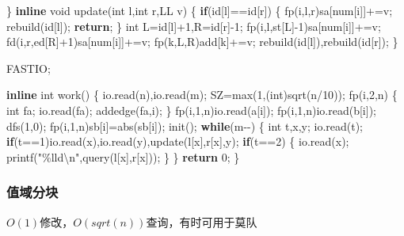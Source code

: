 \documentclass[
]{article}
\newenvironment{Shaded}{}{}
\newcommand{\ControlFlowTok}[1]{\textcolor[rgb]{0.00,0.44,0.13}{\textbf{#1}}}
\newcommand{\DataTypeTok}[1]{\textcolor[rgb]{0.56,0.13,0.00}{#1}}
\newcommand{\DecValTok}[1]{\textcolor[rgb]{0.25,0.63,0.44}{#1}}
\newcommand{\KeywordTok}[1]{\textcolor[rgb]{0.00,0.44,0.13}{\textbf{#1}}}
\newcommand{\NormalTok}[1]{#1}
\newcommand{\SpecialCharTok}[1]{\textcolor[rgb]{0.25,0.44,0.63}{#1}}
\newcommand{\StringTok}[1]{\textcolor[rgb]{0.25,0.44,0.63}{#1}}
\begin{document}
\begin{Shaded}
\begin{Highlighting}[]
\NormalTok{\}}
\KeywordTok{inline} \DataTypeTok{void}\NormalTok{ update(}\DataTypeTok{int}\NormalTok{ l,}\DataTypeTok{int}\NormalTok{ r,LL v)}
\NormalTok{\{}
    \ControlFlowTok{if}\NormalTok{(id[l]==id[r])}
\NormalTok{    \{}
\NormalTok{        fp(i,l,r)sa[num[i]]+=v;}
\NormalTok{        rebuild(id[l]);}
        \ControlFlowTok{return}\NormalTok{;}
\NormalTok{    \}}
    \DataTypeTok{int}\NormalTok{ L=id[l]+}\DecValTok{1}\NormalTok{,R=id[r]{-}}\DecValTok{1}\NormalTok{;}
\NormalTok{    fp(i,l,st[L]{-}}\DecValTok{1}\NormalTok{)sa[num[i]]+=v;}
\NormalTok{    fd(i,r,ed[R]+}\DecValTok{1}\NormalTok{)sa[num[i]]+=v;}
\NormalTok{    fp(k,L,R)add[k]+=v;}
\NormalTok{    rebuild(id[l]),rebuild(id[r]);}
\NormalTok{\}}

\NormalTok{FASTIO;}

\KeywordTok{inline} \DataTypeTok{int}\NormalTok{ work()}
\NormalTok{\{}
\NormalTok{    io.read(n),io.read(m);}
\NormalTok{    SZ=max(}\DecValTok{1}\NormalTok{,(}\DataTypeTok{int}\NormalTok{)sqrt(n/}\DecValTok{10}\NormalTok{));}
\NormalTok{    fp(i,}\DecValTok{2}\NormalTok{,n)}
\NormalTok{    \{}
        \DataTypeTok{int}\NormalTok{ fa;}
\NormalTok{        io.read(fa);}
\NormalTok{        addedge(fa,i);}
\NormalTok{    \}}
\NormalTok{    fp(i,}\DecValTok{1}\NormalTok{,n)io.read(a[i]);}
\NormalTok{    fp(i,}\DecValTok{1}\NormalTok{,n)io.read(b[i]);}
\NormalTok{    dfs(}\DecValTok{1}\NormalTok{,}\DecValTok{0}\NormalTok{);}
\NormalTok{    fp(i,}\DecValTok{1}\NormalTok{,n)sb[i]=abs(sb[i]);}
\NormalTok{    init();}
    \ControlFlowTok{while}\NormalTok{(m{-}{-})}
\NormalTok{    \{}
        \DataTypeTok{int}\NormalTok{ t,x,y; io.read(t);}
        \ControlFlowTok{if}\NormalTok{(t==}\DecValTok{1}\NormalTok{)io.read(x),io.read(y),update(l[x],r[x],y);}
        \ControlFlowTok{if}\NormalTok{(t==}\DecValTok{2}\NormalTok{)}
\NormalTok{        \{}
\NormalTok{            io.read(x);}
\NormalTok{            printf(}\StringTok{"}\SpecialCharTok{\%lld\textbackslash{}n}\StringTok{"}\NormalTok{,query(l[x],r[x]));}
\NormalTok{        \}}
\NormalTok{    \}}
    \ControlFlowTok{return} \DecValTok{0}\NormalTok{;}
\NormalTok{\}}
\end{Highlighting}
\end{Shaded}

\hypertarget{ux503cux57dfux5206ux5757}{%
\subsubsection{值域分块}\label{ux503cux57dfux5206ux5757}}

\(O(1)\)修改，\(O(sqrt(n))\)查询，有时可用于莫队
\end{document}
